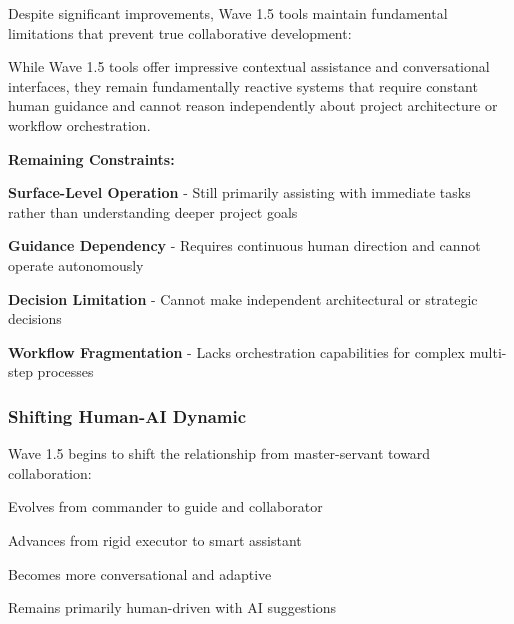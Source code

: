 Despite significant improvements, Wave 1.5 tools maintain fundamental limitations that prevent true collaborative development:

\begin{alertbox}
While Wave 1.5 tools offer impressive contextual assistance and conversational interfaces, they remain fundamentally reactive systems that require constant human guidance and cannot reason independently about project architecture or workflow orchestration.
\end{alertbox}

\textbf{Remaining Constraints:}

\begin{compactlist}
    \item \textbf{Surface-Level Operation} - Still primarily assisting with immediate tasks rather than understanding deeper project goals
    \item \textbf{Guidance Dependency} - Requires continuous human direction and cannot operate autonomously
    \item \textbf{Decision Limitation} - Cannot make independent architectural or strategic decisions
    \item \textbf{Workflow Fragmentation} - Lacks orchestration capabilities for complex multi-step processes
\end{compactlist}

\subsubsection{Shifting Human-AI Dynamic}

Wave 1.5 begins to shift the relationship from master-servant toward collaboration:

\begin{description}[leftmargin=3cm,labelwidth=2.5cm]
    \item[\textbf{Human Role}] Evolves from commander to guide and collaborator
    
    \item[\textbf{AI Role}] Advances from rigid executor to smart assistant
    
    \item[\textbf{Interaction}] Becomes more conversational and adaptive
    
    \item[\textbf{Decision Making}] Remains primarily human-driven with AI suggestions
\end{description}

